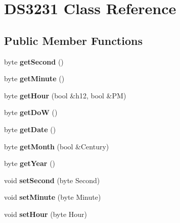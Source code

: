 \hypertarget{class_d_s3231}{}\section{D\+S3231 Class Reference}
\label{class_d_s3231}
\subsection*{Public Member Functions}
\begin{DoxyCompactItemize}
\item 
\mbox{\label{class_d_s3231_a0a1b5bd06bdaef2f9dc687a051f65019}} 
byte {\bfseries get\+Second} ()
\item 
\mbox{\label{class_d_s3231_af9a6ae45147d736a400346edbb04d931}} 
byte {\bfseries get\+Minute} ()
\item 
\mbox{\label{class_d_s3231_aa99e08c85b98e14192b37ee9110035fe}} 
byte {\bfseries get\+Hour} (bool \&h12, bool \&PM)
\item 
\mbox{\label{class_d_s3231_a9601f4b0820a85ff7003d055dc9d0a80}} 
byte {\bfseries get\+DoW} ()
\item 
\mbox{\label{class_d_s3231_abc270cf7a8bc3f3b057183572b61e9cd}} 
byte {\bfseries get\+Date} ()
\item 
\mbox{\label{class_d_s3231_aa9d2d4dd17fcd82339b0a2df77f7a1fc}} 
byte {\bfseries get\+Month} (bool \&Century)
\item 
\mbox{\label{class_d_s3231_aba42f42e83512042ff4a11e577474c7d}} 
byte {\bfseries get\+Year} ()
\item 
\mbox{\label{class_d_s3231_ac6e94fd112e5104ce05a671b9196a565}} 
void {\bfseries set\+Second} (byte Second)
\item 
\mbox{\label{class_d_s3231_aad05b85bec68c3776490eedb7c721122}} 
void {\bfseries set\+Minute} (byte Minute)
\item 
\mbox{\label{class_d_s3231_a1cad649db1d146784ca4957d9a5d9044}} 
void {\bfseries set\+Hour} (byte Hour)

\end{DoxyCompactItemize}
